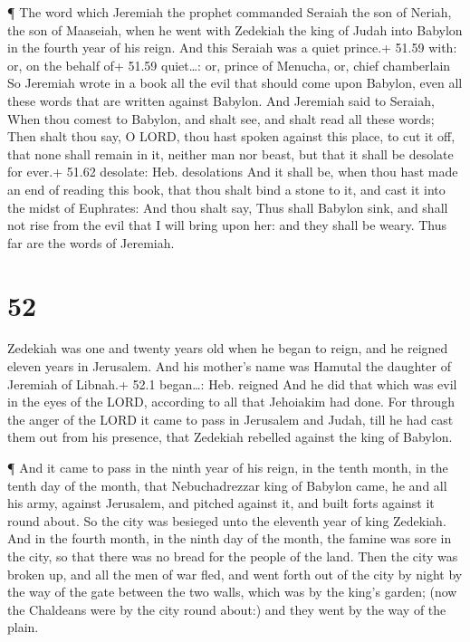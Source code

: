  ¶ The word which Jeremiah the prophet commanded Seraiah
the son of Neriah, the son of Maaseiah, when he went with Zedekiah the
king of Judah into Babylon in the fourth year of his reign. And this
Seraiah was a quiet prince.+ 51.59 with: or, on the behalf of+ 51.59
quiet\ldots: or, prince of Menucha, or, chief chamberlain 
So Jeremiah wrote in a book all the evil that should come upon Babylon,
even all these words that are written against Babylon.  And
Jeremiah said to Seraiah, When thou comest to Babylon, and shalt see,
and shalt read all these words;  Then shalt thou say, O
LORD, thou hast spoken against this place, to cut it off, that none
shall remain in it, neither man nor beast, but that it shall be desolate
for ever.+ 51.62 desolate: Heb. desolations  And it shall
be, when thou hast made an end of reading this book, that thou shalt
bind a stone to it, and cast it into the midst of Euphrates:
 And thou shalt say, Thus shall Babylon sink, and shall not
rise from the evil that I will bring upon her: and they shall be weary.
Thus far are the words of Jeremiah.

\hypertarget{section-51}{%
\section{52}\label{section-51}}

 Zedekiah was one and twenty years old when he began to
reign, and he reigned eleven years in Jerusalem. And his mother's name
was Hamutal the daughter of Jeremiah of Libnah.+ 52.1 began\ldots: Heb.
reigned  And he did that which was evil in the eyes of the
LORD, according to all that Jehoiakim had done.  For through
the anger of the LORD it came to pass in Jerusalem and Judah, till he
had cast them out from his presence, that Zedekiah rebelled against the
king of Babylon.

 ¶ And it came to pass in the ninth year of his reign, in
the tenth month, in the tenth day of the month, that Nebuchadrezzar king
of Babylon came, he and all his army, against Jerusalem, and pitched
against it, and built forts against it round about.  So the
city was besieged unto the eleventh year of king Zedekiah. 
And in the fourth month, in the ninth day of the month, the famine was
sore in the city, so that there was no bread for the people of the land.
 Then the city was broken up, and all the men of war fled,
and went forth out of the city by night by the way of the gate between
the two walls, which was by the king's garden; (now the Chaldeans were
by the city round about:) and they went by the way of the plain.

